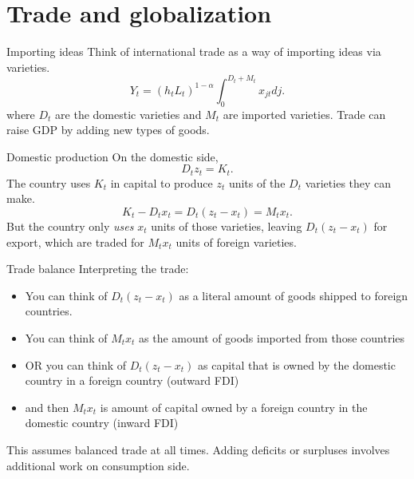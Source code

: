 \section{Trade and globalization}
\begin{frame}{Importing ideas}
Think of international trade as a way of importing ideas via varieties. 
\begin{equation}
	Y_t = (h_t L_t)^{1-\alpha} \int_0^{D_t+M_t} x_{jt} dj \label{EQ_final_trade}.
\end{equation}
where $D_t$ are the domestic varieties and $M_t$ are imported varieties. Trade can raise GDP by adding new types of goods. 
\end{frame}

\begin{frame}{Domestic production}
On the domestic side, 
\begin{equation}
	D_tz_t = K_t. \nonumber
\end{equation}
The country uses $K_t$ in capital to produce $z_t$ units of the $D_t$ varieties they can make. 
\begin{equation}
	K_t - D_tx_t = D_t (z_t - x_t)  = M_tx_t. \label{EQ_Kdxmx}
\end{equation}
But the country only \textit{uses} $x_t$ units of those varieties, leaving $D_t(z_t-x_t)$ for export, which are traded for $M_t x_t$ units of foreign varieties. 
\end{frame}

\begin{frame}{Trade balance}
Interpreting the trade:
\begin{itemize}
	\item You can think of $D_t (z_t - x_t)$ as a literal amount of goods shipped to foreign countries.
	\item You can think of $M_t x_t$ as the amount of goods imported from those countries
	\item OR you can think of $D_t (z_t - x_t)$ as capital that is owned by the domestic country in a foreign country (outward FDI)
	\item and then $M_tx_t$ is amount of capital owned by a foreign country in the domestic country (inward FDI) 
\end{itemize}
This assumes balanced trade at all times. Adding deficits or surpluses involves additional work on consumption side. 
\end{frame}

